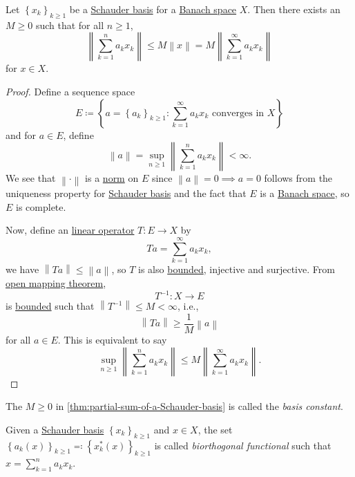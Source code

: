 \begin{theorem}\label{thm:partial-sum-of-a-Schauder-basis}
	Let \(\left\{ x_k \right\} _{k\geq 1}\) be a \hyperref[def:Schauder-basis]{Schauder basis} for a \hyperref[def:Banach-space]{Banach space} \(X\). Then there exists an \(M \geq 0\) such that for all \(n \geq 1\),
	\[
		\left\lVert \sum\limits_{k=1}^{n} a_k x_k\right\rVert \leq M \left\lVert x\right\rVert = M \left\lVert \sum\limits_{k=1}^{\infty} a_k x_k\right\rVert
	\]
	for \(x\in X\).
\end{theorem}
\begin{proof}
	Define a sequence space
	\[
		E \coloneqq \left\{ a= \left\{ a_k \right\} _{k\geq 1}\colon \sum\limits_{k=1}^{\infty} a_k x_k \text{ converges in \(X\)} \right\}
	\]
	and for \(a\in E\), define
	\[
		\left\lVert a\right\rVert = \sup _{n \geq 1} \left\lVert \sum\limits_{k=1}^{n} a_k x_k\right\rVert < \infty.
	\]
	We see that \(\left\lVert \cdot \right\rVert \) is a \hyperref[def:norm]{norm} on \(E\) since \(\left\lVert a\right\rVert = 0 \implies a=0\) follows from the uniqueness property for \hyperref[def:Schauder-basis]{Schauder basis} and the fact that \(E\) is a \hyperref[def:Banach-space]{Banach space}, so \(E\) is complete.

	Now, define an \hyperref[def:linear-op]{linear operator} \(T\colon E\to X\) by
	\[
		Ta = \sum\limits_{k=1}^{\infty} a_k x_k,
	\]
	we have \(\left\lVert Ta\right\rVert \leq \left\lVert a\right\rVert \), so \(T\) is also \hyperref[def:bounded-linear-op]{bounded}, injective and surjective. From \hyperref[thm:open-mapping]{open mapping theorem},
	\[
		T ^{-1} \colon X\to E
	\]
	is \hyperref[def:bounded-linear-op]{bounded} such that \(\left\lVert T^{-1} \right\rVert \leq M < \infty\), i.e.,
	\[
		\left\lVert Ta\right\rVert \geq \frac{1}{M} \left\lVert a\right\rVert
	\]
	for all \(a\in E\). This is equivalent to say
	\[
		\sup _{n \geq 1} \left\lVert \sum\limits_{k=1}^{n} a_k x_k\right\rVert \leq M \left\lVert \sum\limits_{k=1}^{\infty} a_k x_k\right\rVert.
	\]
\end{proof}

\begin{notation}\label{not:basis-constant}
	The \(M\geq 0\) in \autoref{thm:partial-sum-of-a-Schauder-basis} is called the \emph{basis constant}.
\end{notation}

\begin{definition}\label{def:biorthogonal-functional}
	Given a \hyperref[def:Schauder-basis]{Schauder basis} \(\left\{ x_k \right\} _{k\geq 1}\) and \(x\in X\), the set \(\left\{ a_k(x) \right\} _{k\geq 1} \eqqcolon \left\{ x^{\ast} _k (x)\right\}_{k\geq 1} \) is called \emph{biorthogonal functional} such that \(x = \sum_{k=1}^n a_k x_k \).
\end{definition}

